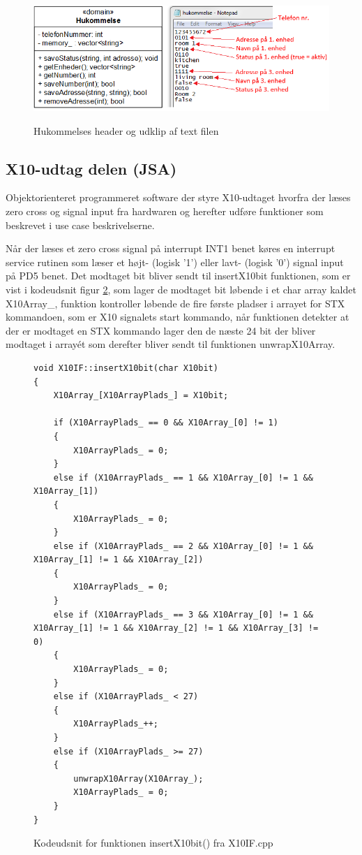 \begin{figure}[htbp] \centering
{\includegraphics[width=\textwidth]{billeder/uml/pc_dataview}}
\caption{Hukommelses header og udklip af text filen}
\label{fig:Hukommelses header og udklip af text filen}
\end{figure}

\subsection{X10-udtag delen (JSA)}

Objektorienteret programmeret software der styre X10-udtaget hvorfra der læses zero cross og signal input fra hardwaren og herefter udføre funktioner som beskrevet i use case beskrivelserne.

Når der læses et zero cross signal på interrupt INT1 benet køres en interrupt service rutinen som læser et højt- (logisk '1') eller lavt- (logisk '0') signal input på PD5 benet. Det modtaget bit bliver sendt til insertX10bit funktionen, som er vist i kodeudsnit figur \ref{fig:X10IF_insertX10bit}, som lager de modtaget bit løbende i et char array kaldet X10Array\_, funktion kontroller løbende de fire første pladser i arrayet for STX kommandoen, som er X10 signalets start kommando, når funktionen detekter at der er modtaget en STX kommando lager den de næste 24 bit der bliver modtaget i array\'et som derefter bliver sendt til funktionen unwrapX10Array. 

\begin{figure}[!htb]
\lstset{language=C++}
\begin{lstlisting}
void X10IF::insertX10bit(char X10bit)
{
	X10Array_[X10ArrayPlads_] = X10bit;
	
	if (X10ArrayPlads_ == 0 && X10Array_[0] != 1)
	{
		X10ArrayPlads_ = 0;
	}	
	else if (X10ArrayPlads_ == 1 && X10Array_[0] != 1 && X10Array_[1])
	{
		X10ArrayPlads_ = 0;
	}	
	else if (X10ArrayPlads_ == 2 && X10Array_[0] != 1 && X10Array_[1] != 1 && X10Array_[2])
	{
		X10ArrayPlads_ = 0;
	}
	else if (X10ArrayPlads_ == 3 && X10Array_[0] != 1 && X10Array_[1] != 1 && X10Array_[2] != 1 && X10Array_[3] != 0)
	{
		X10ArrayPlads_ = 0;
	}
	else if (X10ArrayPlads_ < 27)
	{
		X10ArrayPlads_++;
	}	
	else if (X10ArrayPlads_ >= 27)
	{
		unwrapX10Array(X10Array_);
		X10ArrayPlads_ = 0;
	}
}
\end{lstlisting}
\caption{Kodeudsnit for funktionen insertX10bit() fra X10IF.cpp}
\label{fig:X10IF_insertX10bit}
\end{figure}

